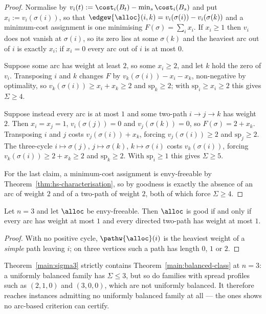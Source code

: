 \begin{proof}
Normalise by $v_i(t) := \cost_i(B_t) - \min_s \cost_i(B_s)$ and put
$x_i := v_i(\sigma(i))$, so that
$\edgew{\alloc}(i,k) = v_i(\sigma(i)) - v_i(\sigma(k))$ and a minimum-cost
assignment is one minimising $F(\sigma) = \sum_i x_i$. If $x_i \ge 1$ then $v_i$
does not vanish at $\sigma(i)$, so its zero lies at some $\sigma(k)$ and the
heaviest arc out of $i$ is exactly $x_i$; if $x_i = 0$ every arc out of $i$ is at
most $0$.

Suppose some arc has weight at least $2$, so some $x_i \ge 2$, and let $k$ hold
the zero of $v_i$. Transposing $i$ and $k$ changes $F$ by
$v_k(\sigma(i)) - x_i - x_k$, non-negative by optimality, so
$v_k(\sigma(i)) \ge x_i + x_k \ge 2$ and $\mathrm{sp}_k \ge 2$; with
$\mathrm{sp}_i \ge x_i \ge 2$ this gives $\Sigma \ge 4$.

Suppose instead every arc is at most $1$ and some two-path $i \to j \to k$ has
weight $2$. Then $x_i = x_j = 1$, $v_i(\sigma(j)) = 0$ and $v_j(\sigma(k)) = 0$,
so $F(\sigma) = 2 + x_k$. Transposing $i$ and $j$ costs
$v_j(\sigma(i)) + x_k$, forcing $v_j(\sigma(i)) \ge 2$ and $\mathrm{sp}_j \ge 2$.
The three-cycle $i \mapsto \sigma(j)$, $j \mapsto \sigma(k)$, $k \mapsto
\sigma(i)$ costs $v_k(\sigma(i))$, forcing $v_k(\sigma(i)) \ge 2 + x_k \ge 2$ and
$\mathrm{sp}_k \ge 2$. With $\mathrm{sp}_i \ge 1$ this gives $\Sigma \ge 5$.

For the last claim, a minimum-cost assignment is envy-freeable by
Theorem~\ref{thm:hs-characterisation}, so by  goodness is
exactly the absence of an arc of weight $2$ and of a two-path of weight $2$, both
of which force $\Sigma \ge 4$.
\end{proof}

\begin{proposition}
\label{prop:n3-main}
Let $n = 3$ and let $\alloc$ be envy-freeable. Then $\alloc$ is good if and only
if every arc has weight at most $1$ and every directed two-path has weight at
most $1$.
\end{proposition}

\begin{proof}
With no positive cycle, $\pathw{\alloc}(i)$ is the heaviest weight of a
\emph{simple} path leaving $i$; on three vertices such a path has length $0$, $1$
or $2$.
\end{proof}

Theorem~\ref{main:sigma3} strictly contains Theorem~\ref{main:balanced-class} at
$n = 3$: a uniformly balanced family has $\Sigma \le 3$, but so do families with
spread profiles such as $(2,1,0)$ and $(3,0,0)$, which are not uniformly
balanced. It therefore reaches instances admitting no uniformly balanced family
at all --- the ones  shows no arc-based criterion can
certify.

